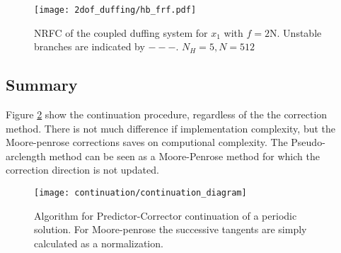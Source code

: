 \begin{figure}[!ht]
  \centering
  \texttt{[image: 2dof\_duffing/hb\_frf.pdf]}
  \caption{NRFC of the coupled duffing system for $x_1$ with $f=2$N. Unstable
    branches are indicated by $- - -$. $N_H = 5, N = 512$}
  \label{fig:hb_frf_2dof}
 \end{figure}

\subsection{Summary}
\label{sec:cont_summary}

Figure \ref{fig:cont_algo} show the continuation procedure, regardless of the
the correction method. There is not much difference if implementation
complexity, but the Moore-penrose corrections saves on computional complexity.
The Pseudo-arclength method can be seen as a Moore-Penrose method for which the
correction direction is not updated.

\begin{figure}[!ht]
  \centering
  \texttt{[image: continuation/continuation\_diagram]}
  \caption{Algorithm for Predictor-Corrector continuation of a periodic
    solution. For Moore-penrose the successive tangents are simply calculated as
  a normalization.}
  \label{fig:cont_algo}
\end{figure}



